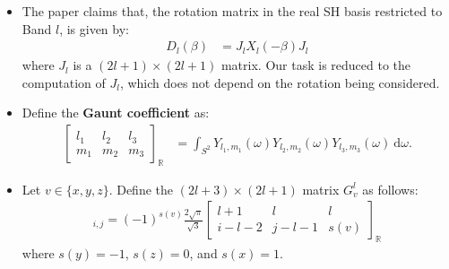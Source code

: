 \documentclass[10pt]{article}
\newcommand{\dee}{\mathrm{d}}
\newcommand{\Real}{\mathbb{R}}
\begin{document}
\begin{itemize}
        \item The paper claims that, the rotation matrix in the real SH basis restricted to Band $l$, is given by:
        \begin{align*}
            D_l(\beta) &= J_l X_l(-\beta) J_l
        \end{align*}
        where $J_l$ is a $(2l+1) \times (2l+1)$ matrix.  Our task is reduced to the computation of $J_l$, which does not depend on the rotation being considered.

        \item Define the \textbf{Gaunt coefficient} as:
        \begin{align*}
            \begin{bmatrix}
                l_1 & l_2 & l_3 \\
                m_1 & m_2 & m_3
            \end{bmatrix}_\Real
            &= \int_{S^2} Y_{l_1,m_1}(\omega) Y_{l_2,m_2}(\omega) Y_{l_3,m_3}(\omega)\ \dee\omega.
        \end{align*}

        \item Let $v \in \{x, y, z\}$.  Define the $(2l+3) \times (2l+1)$ matrix $G^l_v$ as follows:
        \begin{align*}
            [G_v^l]_{i,j} = (-1)^{s(v)} \frac{2\sqrt{\pi}}{\sqrt{3}}
            \begin{bmatrix}
                l+1 & l & l \\
                i-l-2 & j-l-1 & s(v)
            \end{bmatrix}_\Real
        \end{align*}
        where $s(y) = -1$, $s(z) = 0$, and $s(x) = 1$.


\end{itemize}
\end{document}
